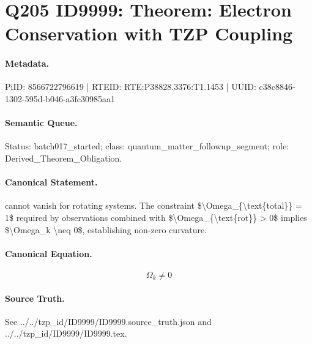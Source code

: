 \section*{Q205 ID9999: Theorem: Electron Conservation with TZP Coupling}
\paragraph{Metadata.}
PiID: 8566722796619 | RTEID: RTE:P38828.3376:T1.1453 | UUID: c38c8846-1302-595d-b046-a3fc30985aa1

\paragraph{Semantic Queue.}
Status: batch017\_started; class: quantum\_matter\_followup\_segment; role: Derived\_Theorem\_Obligation.

\paragraph{Canonical Statement.}
cannot vanish for rotating systems. The constraint \$\textbackslash{}Omega\_\{\textbackslash{}text\{total\}\} = 1\$ required by observations combined with \$\textbackslash{}Omega\_\{\textbackslash{}text\{rot\}\} > 0\$ implies \$\textbackslash{}Omega\_k \textbackslash{}neq 0\$, establishing non-zero curvature.

\paragraph{Canonical Equation.}
\[
\Omega_k \neq 0
\]

\paragraph{Source Truth.}
See ../../tzp\_id/ID9999/ID9999.source\_truth.json and ../../tzp\_id/ID9999/ID9999.tex.
